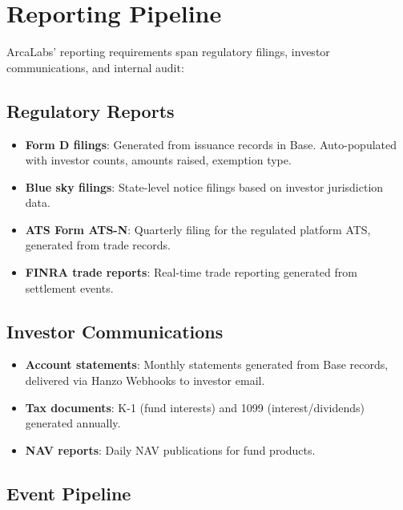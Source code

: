 \section{Reporting Pipeline}

\label{sec:reporting}

ArcaLabs' reporting requirements span regulatory filings, investor
communications, and internal audit:

\subsection{Regulatory Reports}

\begin{itemize}[leftmargin=1.4em]
    \item \textbf{Form D filings}: Generated from issuance records in
    Base. Auto-populated with investor counts, amounts raised,
    exemption type.
    \item \textbf{Blue sky filings}: State-level notice filings based
    on investor jurisdiction data.
    \item \textbf{ATS Form ATS-N}: Quarterly filing for the regulated platform
    ATS, generated from trade records.
    \item \textbf{FINRA trade reports}: Real-time trade reporting
    generated from settlement events.
\end{itemize}

\subsection{Investor Communications}

\begin{itemize}[leftmargin=1.4em]
    \item \textbf{Account statements}: Monthly statements generated from
    Base records, delivered via Hanzo Webhooks to investor email.
    \item \textbf{Tax documents}: K-1 (fund interests) and 1099
    (interest/dividends) generated annually.
    \item \textbf{NAV reports}: Daily NAV publications for fund products.
\end{itemize}

\subsection{Event Pipeline}

